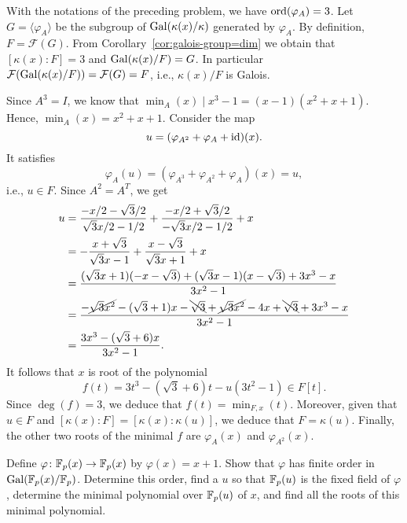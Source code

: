 \begin{solution}
    With the notations of the preceding problem, we have ${\rm ord}(\varphi_A)=3$. Let $G=\langle\varphi_A\rangle$ be the subgroup of $\operatorname{Gal}(\kappa(x)/\kappa)$ generated by $\varphi_A$. By definition, $F=\mathcal F(G)$. From Corollary~\ref{cor:galois-group=dim} we obtain that $[\kappa(x):F]=3$ and $\operatorname{Gal}(\kappa(x)/F)=G$. In particular $\mathcal F(\operatorname{Gal}(\kappa(x)/F))=\mathcal F(G)=F$, i.e., $\kappa(x)/F$ is Galois.

    Since $A^3=I$, we know that $\min_A(x)\mid x^3-1=(x-1)(x^2+x+1)$. Hence, $\min_A(x)=x^2+x+1$. Consider the map
    $$
        u = (\varphi_{A^2} + \varphi_A + \operatorname{id})(x).
    $$
    It satisfies
    $$
        \varphi_A(u)=(\varphi_{A^3}+\varphi_{A^2}+\varphi_A)(x)
            = u,
    $$
    i.e., $u\in F$. Since $A^2=A^T$, we get
    \begin{align*}
        u &= \frac{-x/2-\sqrt3/2}{\sqrt3x/2-1/2} +
            \frac{-x/2+\sqrt3/2}{-\sqrt3x/2-1/2} + x\\
            &= -\frac{x+\sqrt3}{\sqrt3x-1}
            +\frac{x-\sqrt3}{\sqrt3x+1}+x\\
            &= \frac{(\sqrt3x+1)(-x-\sqrt3)+(\sqrt3x-1)(x-\sqrt3)+3x^3-x}{3x^2-1}\\
            &= \frac{-\cancel{\sqrt3x^2}-(\sqrt3+1)x-\bcancel{\sqrt3}
                +\cancel{\sqrt3x^2}-4x+\bcancel{\sqrt3}
                +3x^3-x}{3x^2-1}\\
            &= \frac{3x^3-(\sqrt3+6)x}{3x^2-1}.
    \end{align*}
    It follows that $x$ is root of the polynomial
    $$
        f(t) = 3t^3-(\sqrt3+6)t-u(3t^2-1)\in F[t].
    $$
    Since $\deg(f)=3$, we deduce that $f(t)=\min_{F,x}(t)$. Moreover, given that $u\in F$ and $[\kappa(x):F]=[\kappa(x):\kappa(u)]$, we deduce that $F=\kappa(u)$. Finally, the other two roots of the minimal $f$ are $\varphi_A(x)$ and $\varphi_{A^2}(x)$.
\end{solution}

\begin{probl}\label{probl:Fp(u)}
    Define\/ $\varphi\colon\mathbb F_p(x)\to\mathbb F_p(x)$ by\/ $\varphi(x)=x+1$. Show that\/ $\varphi$ has finite order in\/ $\operatorname{Gal}(\mathbb F_p(x)/\mathbb F_p)$. Determine this order, find a\/ $u$ so that\/ $\mathbb F_p(u)$ is the fixed field of\/ $\varphi$, determine the minimal polynomial over\/ $\mathbb F_p(u)$ of\/ $x$, and find all the roots of this minimal polynomial. 
\end{probl}


